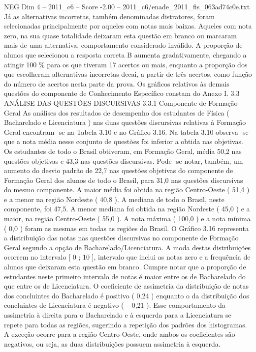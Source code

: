 \begin{textsample}{NEG Dim 4 – 2011\_c6 – Score -2.00 – 2011\_c6/enade\_2011\_fis\_063ad74c0e.txt}
Já as alternativas incorretas, também denominadas distratores, foram selecionadas principalmente por aqueles com notas mais baixas.
Aqueles com nota zero, na sua quase totalidade deixaram esta questão em branco ou marcaram mais de uma alternativa, comportamento considerado inválido.
A proporção de alunos que selecionou a resposta correta B aumenta gradativamente, chegando a atingir 100 \% para os que tiveram 17 acertos ou mais, enquanto a proporção dos que escolheram alternativas incorretas decai, a partir de três acertos, como função do número de acertos nesta parte da prova.
Os gráficos relativos às demais questões do componente de Conhecimento Específico constam do Anexo I. 3.3 ANÁLISE DAS QUESTÕES DISCURSIVAS 3.3.1 Componente de Formação Geral As análises dos resultados de desempenho dos estudantes de Física ( Bacharelado e Licenciatura ) nas duas questões discursivas relativas à Formação Geral encontram -se na Tabela 3.10 e no Gráfico 3.16.
Na tabela 3.10 observa -se que a nota média nesse conjunto de questões foi inferior a obtida nas objetivas.
Os estudantes de todo o Brasil obtiveram, em Formação Geral, média 50,2 nas questões objetivas e 43,3 nas questões discursivas.
Pode -se notar, também, um aumento do desvio padrão de 22,7 nas questões objetivas do componente de Formação Geral dos alunos de todo o Brasil, para 31,0 nas questões discursivas do mesmo componente.
A maior média foi obtida na região Centro-Oeste ( 51,4 ) e a menor na região Nordeste ( 40,8 ).
A mediana de todo o Brasil, neste componente, foi 47,5.
A menor mediana foi obtida na região Nordeste ( 45,0 ) e a maior, na região Centro-Oeste ( 55,0 ).
A nota máxima ( 100,0 ) e a nota mínima ( 0,0 ) foram as mesmas em todas as regiões do Brasil.
O Gráfico 3.16 representa a distribuição das notas nas questões discursivas no componente de Formação Geral segundo a opção de Bacharelado/Licenciatura.
A moda destas distribuições ocorrem no intervalo [ 0 ; 10 ], intervalo que inclui as notas zero e a frequência de alunos que deixaram esta questão em branco.
Cumpre notar que a proporção de estudantes neste primeiro intervalo de notas é maior entre os de Bacharelado do que entre os de Licenciatura.
O coeficiente de assimetria da distribuição de notas dos concluintes do Bacharelado é positivo ( 0,24 ) enquanto o da distribuição dos concluintes de Licenciatura é negativo ( – 0,21 ).
Esse comportamento da assimetria à direita para o Bacharelado e à esquerda para a Licenciatura se repete para todas as regiões, sugerindo a repetição dos padrões dos histogramas.
A exceção ocorre para a região Centro-Oeste, onde ambos os coeficientes são negativos, ou seja, as duas distribuições possuem assimetria à esquerda.

\end{textsample}
